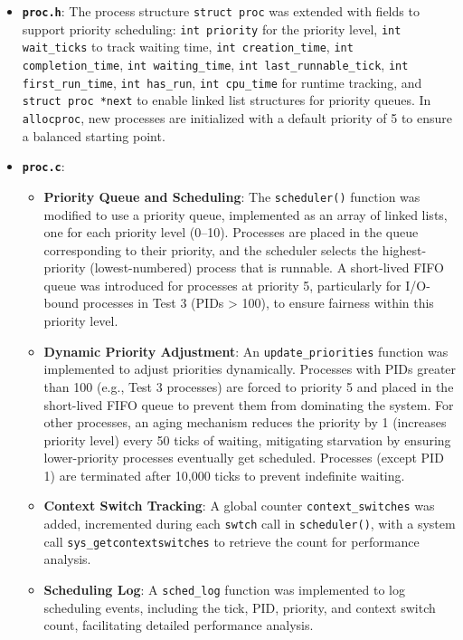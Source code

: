 \documentclass{article}
\begin{document}
\begin{itemize}
    \item \textbf{\texttt{proc.h}}: The process structure \texttt{struct proc} was extended with fields to support priority scheduling: \texttt{int priority} for the priority level, \texttt{int wait\_ticks} to track waiting time, \texttt{int creation\_time}, \texttt{int completion\_time}, \texttt{int waiting\_time}, \texttt{int last\_runnable\_tick}, \texttt{int first\_run\_time}, \texttt{int has\_run}, \texttt{int cpu\_time} for runtime tracking, and \texttt{struct proc *next} to enable linked list structures for priority queues. In \texttt{allocproc}, new processes are initialized with a default priority of 5 to ensure a balanced starting point.
    
    \item \textbf{\texttt{proc.c}}:
        \begin{itemize}
            \item \textbf{Priority Queue and Scheduling}: The \texttt{scheduler()} function was modified to use a priority queue, implemented as an array of linked lists, one for each priority level (0–10). Processes are placed in the queue corresponding to their priority, and the scheduler selects the highest-priority (lowest-numbered) process that is runnable. A short-lived FIFO queue was introduced for processes at priority 5, particularly for I/O-bound processes in Test 3 (PIDs > 100), to ensure fairness within this priority level.
            \item \textbf{Dynamic Priority Adjustment}: An \texttt{update\_priorities} function was implemented to adjust priorities dynamically. Processes with PIDs greater than 100 (e.g., Test 3 processes) are forced to priority 5 and placed in the short-lived FIFO queue to prevent them from dominating the system. For other processes, an aging mechanism reduces the priority by 1 (increases priority level) every 50 ticks of waiting, mitigating starvation by ensuring lower-priority processes eventually get scheduled. Processes (except PID 1) are terminated after 10,000 ticks to prevent indefinite waiting.
            \item \textbf{Context Switch Tracking}: A global counter \texttt{context\_switches} was added, incremented during each \texttt{swtch} call in \texttt{scheduler()}, with a system call \texttt{sys\_getcontextswitches} to retrieve the count for performance analysis.
            \item \textbf{Scheduling Log}: A \texttt{sched\_log} function was implemented to log scheduling events, including the tick, PID, priority, and context switch count, facilitating detailed performance analysis.
        \end{itemize}
    

\end{itemize}
\end{document}
